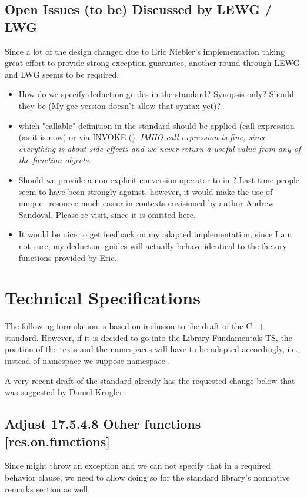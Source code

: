 \documentclass[ebook,11pt,article]{memoir}
\begin{document}
\section{Open Issues (to be) Discussed by LEWG / LWG}
Since a lot of the design changed due to Eric Niebler's implementation taking great effort to provide strong exception guarantee, another round through LEWG and LWG seems to be required.
\begin{itemize}
\item How do we specify deduction guides in the standard? Synopsis only? Should they be  (My gcc version doesn't allow that syntax yet)?
\item which "callable" definition in the standard should be applied (call expression (as it is now) or via INVOKE (). 
\emph{IMHO call expression is fine, since everything is about side-effects and we never return a useful value from any of the function objects.}
\item Should we provide a non-explicit conversion operator to  in  ? Last time people seem to have been strongly against, however, it would make the use of unique_resource much easier in contexts envisioned by author Andrew Sandoval. Please re-visit, since it is omitted here.
\item It would be nice to get feedback on my adapted implementation, since I am not sure, my deduction guides will actually behave identical to the factory functions provided by Eric.
\end{itemize}

\newpage
\chapter{Technical Specifications}
The following formulation is based on inclusion to the draft of the C++ standard. However, if it is decided to go into the Library Fundamentals TS, the position of the texts and the namespaces will have to be adapted accordingly, i.e., instead of namespace  we suppose namespace . 

A very recent draft of the standard already has the requested change below that was suggested by Daniel Kr\"ugler:

\section{Adjust 17.5.4.8 Other functions [res.on.functions]}
Since  might throw an exception and we can not specify that in a required behavior clause, we need to allow doing so for the standard library's normative remarks section as well.
\end{document}
